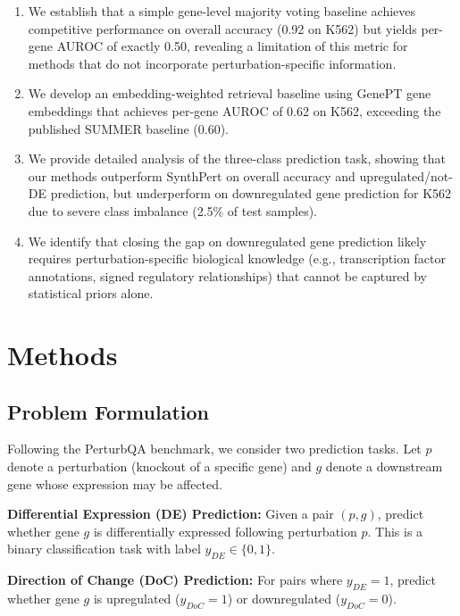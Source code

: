 \documentclass[11pt]{article}
\begin{document}
\begin{enumerate}
    \item We establish that a simple gene-level majority voting baseline achieves competitive performance on overall accuracy (0.92 on K562) but yields per-gene AUROC of exactly 0.50, revealing a limitation of this metric for methods that do not incorporate perturbation-specific information.

    \item We develop an embedding-weighted retrieval baseline using GenePT gene embeddings \citep{chen2023genept} that achieves per-gene AUROC of 0.62 on K562, exceeding the published SUMMER baseline (0.60).

    \item We provide detailed analysis of the three-class prediction task, showing that our methods outperform SynthPert on overall accuracy and upregulated/not-DE prediction, but underperform on downregulated gene prediction for K562 due to severe class imbalance (2.5\% of test samples).

    \item We identify that closing the gap on downregulated gene prediction likely requires perturbation-specific biological knowledge (e.g., transcription factor annotations, signed regulatory relationships) that cannot be captured by statistical priors alone.
\end{enumerate}

\section{Methods}

\subsection{Problem Formulation}

Following the PerturbQA benchmark, we consider two prediction tasks. Let $p$ denote a perturbation (knockout of a specific gene) and $g$ denote a downstream gene whose expression may be affected.

\textbf{Differential Expression (DE) Prediction:} Given a pair $(p, g)$, predict whether gene $g$ is differentially expressed following perturbation $p$. This is a binary classification task with label $y_{DE} \in \{0, 1\}$.

\textbf{Direction of Change (DoC) Prediction:} For pairs where $y_{DE} = 1$, predict whether gene $g$ is upregulated ($y_{DoC} = 1$) or downregulated ($y_{DoC} = 0$).
\end{document}
